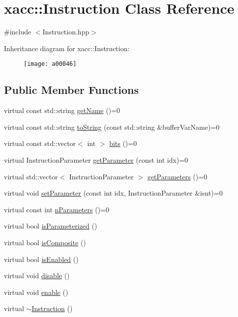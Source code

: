 \hypertarget{a00046}{}\section{xacc\+:\+:Instruction Class Reference}
\label{a00046}


{\ttfamily \#include $<$Instruction.\+hpp$>$}

Inheritance diagram for xacc\+:\+:Instruction\+:\begin{figure}[H]
\begin{center}
\leavevmode
\texttt{[image: a00046]}
\end{center}
\end{figure}
\subsection*{Public Member Functions}
\begin{DoxyCompactItemize}
\item 
virtual const std\+::string \hyperlink{a00046_ac7ff23f693e2276edbf3fdac5452792c}{get\+Name} ()=0
\item 
virtual const std\+::string \hyperlink{a00046_ae94c2d089908294c1d410b14c96817ae}{to\+String} (const std\+::string \&buffer\+Var\+Name)=0
\item 
virtual const std\+::vector$<$ int $>$ \hyperlink{a00046_a819f32e94c3e1c9e69a0061aaf8d86dc}{bits} ()=0
\item 
virtual Instruction\+Parameter \hyperlink{a00046_aa0d9de97a4833a042379647f83c33ab6}{get\+Parameter} (const int idx)=0
\item 
virtual std\+::vector$<$ Instruction\+Parameter $>$ \hyperlink{a00046_aeb67c67713896e8f27a5c7dd531f3340}{get\+Parameters} ()=0
\item 
virtual void \hyperlink{a00046_a407a0ac662fa0b1ec3e301e8ff9bade7}{set\+Parameter} (const int idx, Instruction\+Parameter \&isnt)=0
\item 
virtual const int \hyperlink{a00046_ad54585d13c04ffd20296fff7ab8107ff}{n\+Parameters} ()=0
\item 
virtual bool \hyperlink{a00046_a7b24d8ae485369fc2b2df7a3224a5e26}{is\+Parameterized} ()
\item 
virtual bool \hyperlink{a00046_a4383f1036d0fcfe890ab9c613dbd5f38}{is\+Composite} ()
\item 
virtual bool \hyperlink{a00046_ad02a1cf7220577124720b7a51424cea7}{is\+Enabled} ()
\item 
virtual void \hyperlink{a00046_a6e528da15e05a94cc1d7db268c483271}{disable} ()
\item 
virtual void \hyperlink{a00046_a0b4f2e5a591af28342a3c08e4305e24f}{enable} ()
\item 
virtual \hyperlink{a00046_ae22c935e8113bce63d1d0e214cda4d61}{$\sim$\+Instruction} ()
\end{DoxyCompactItemize}
